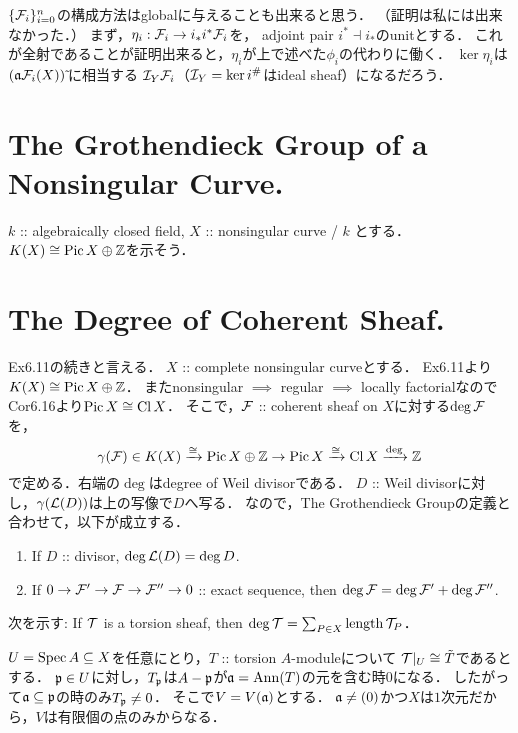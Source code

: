 \documentclass[a4paper]{jsarticle}
\newcommand{\Cl}{\operatorname{Cl}}
\newcommand{\Pic}{\operatorname{Pic}}
\begin{document}
    \begin{Remark}
        $\{ \mathcal{F}_i \}_{i=0}^n$の構成方法はglobalに与えることも出来ると思う．
        （証明は私には出来なかった．）
        まず，$\eta_i: \mathcal{F}_i \to i_* i^* \mathcal{F}_i$を，
        adjoint pair $i^* \dashv i_*$のunitとする．
        これが全射であることが証明出来ると，$\eta_i$が上で述べた$\phi_i$の代わりに働く．
        $\ker \eta_i$は$(\mathfrak{a}\mathcal{F}_i(X))\,\tilde{}$に相当する
        $\mathcal{I}_Y \mathcal{F}_i$（$\mathcal{I}_Y=\ker i^{\#}$はideal sheaf）になるだろう．
    \end{Remark}

\section{The Grothendieck Group of a Nonsingular Curve.} %
    $k$ :: algebraically closed field, $X$ :: nonsingular curve / $k$
    とする．$K(X) \cong \Pic X \oplus \Z$を示そう．

\section{The Degree of Coherent Sheaf.} %
    Ex6.11の続きと言える．
    $X$ :: complete nonsingular curveとする．
    Ex6.11より$K(X) \iso \Pic X \oplus \Z$．
    またnonsingular $\implies$ regular $\implies$ locally factorialなので
    Cor6.16より$\Pic X \iso \Cl X$．
    そこで，$\mathcal{F}$ :: coherent sheaf on $X$に対する$\deg \mathcal{F}$を，
    \[ \gamma(\shF) \in K(X) \isomap \Pic X \oplus \Z \to \Pic X \isomap \Cl X \xrightarrow{\deg} \Z \]
    で定める．右端の$\deg$はdegree of Weil divisorである．
    $D$ :: Weil divisorに対し，$\gamma(\mathcal{L}(D))$は上の写像で$D$へ写る．
    なので，The Grothendieck Groupの定義と合わせて，以下が成立する．

    \begin{enumerate}[label=(\arabic*)]
        \item If $D$ :: divisor, $\deg \mathcal{L}(D)=\deg D$.
        \item If $0 \to \mathcal{F}' \to \mathcal{F} \to \mathcal{F}'' \to 0$ :: exact sequence, 
            then $\deg \mathcal{F}=\deg \mathcal{F}'+\deg \mathcal{F}''$.
    \end{enumerate}
    次を示す:
    If $\mathcal{T}$ is a torsion sheaf, then $\deg \mathcal{T}=\sum_{P \in X} \operatorname{length} \mathcal{T}_P$．

    $U=\operatorname{Spec} A \subseteq X$を任意にとり，$T$ :: torsion $A$-moduleについて
    $\mathcal{T}|_U \cong \tilde{T}$であるとする．
    $\mathfrak{p} \in U$に対し，$T_{\mathfrak{p}}$は$A-\mathfrak{p}$が$\mathfrak{a}=\operatorname{Ann}(T)$の元を含む時$0$になる．
    したがって$\mathfrak{a} \subseteq \mathfrak{p}$の時のみ$T_{\mathfrak{p}} \neq 0$．
    そこで$V=V(\mathfrak{a})$とする．
    $\mathfrak{a} \neq (0)$かつ$X$は$1$次元だから，$V$は有限個の点のみからなる．
\end{document}
